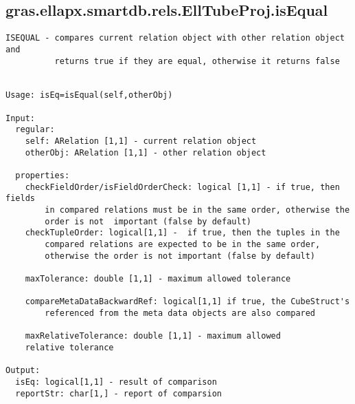 \subsection{\texorpdfstring{gras.ellapx.smartdb.rels.EllTubeProj.isEqual}{isEqual}}\label{method:gras.ellapx.smartdb.rels.EllTubeProj.isEqual}
\begin{verbatim}
ISEQUAL - compares current relation object with other relation object and
          returns true if they are equal, otherwise it returns false


Usage: isEq=isEqual(self,otherObj)

Input:
  regular:
    self: ARelation [1,1] - current relation object
    otherObj: ARelation [1,1] - other relation object

  properties:
    checkFieldOrder/isFieldOrderCheck: logical [1,1] - if true, then fields
        in compared relations must be in the same order, otherwise the
        order is not  important (false by default)
    checkTupleOrder: logical[1,1] -  if true, then the tuples in the
        compared relations are expected to be in the same order,
        otherwise the order is not important (false by default)

    maxTolerance: double [1,1] - maximum allowed tolerance

    compareMetaDataBackwardRef: logical[1,1] if true, the CubeStruct's
        referenced from the meta data objects are also compared

    maxRelativeTolerance: double [1,1] - maximum allowed
    relative tolerance

Output:
  isEq: logical[1,1] - result of comparison
  reportStr: char[1,] - report of comparsion
\end{verbatim}
